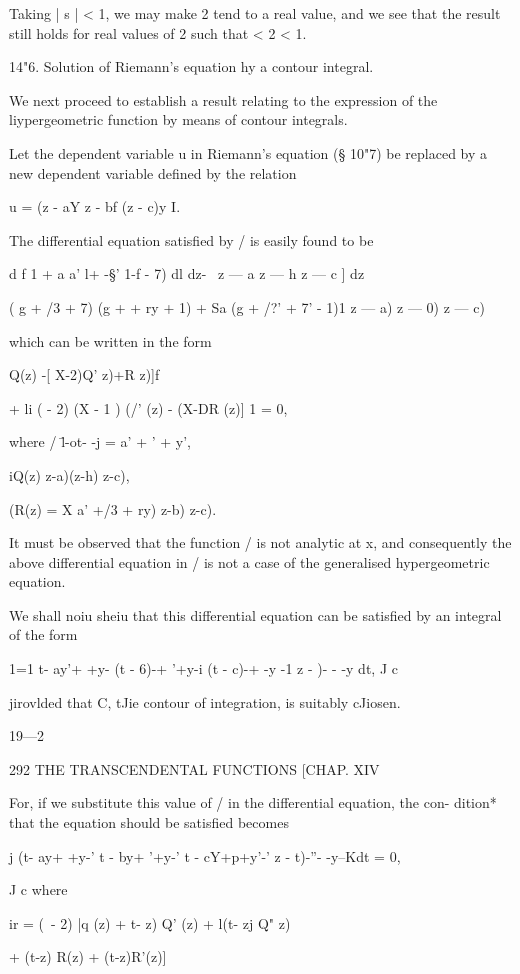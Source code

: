 Taking | s | < 1, we may make 2 tend to a real value, and we see that
the result still holds for real values of 2 such that < 2 < 1.

14"6. Solution of Riemann's equation hy a contour integral.

We next proceed to establish a result relating to the expression of
the liypergeometric function by means of contour integrals.

Let the dependent variable u in Riemann's equation (§ 10"7) be
replaced by a new dependent variable defined by the relation

u = (z - aY z - bf (z - c)y I.

The differential equation satisfied by / is easily found to be

d f 1 + a a' l+ -§' 1-f - 7) dl dz- \ z — a z — h z — c ] dz

( g + /3 + 7) (g + + ry + 1) + Sa (g + /?' + 7' - 1)1 z — a) z — 0) z
— c)

which can be written in the form

Q(z) -[ X-2)Q' z)+R z)]f

+ li ( - 2) (X - 1 ) (/' (z) - (X-DR (z)] 1 = 0,

where / \=l-ot- -j = a' + ' + y',

iQ(z) z-a)(z-h) z-c),

(R(z) = X a' +/3 + ry) z-b) z-c).

It must be observed that the function / is not analytic at x, and
consequently the above differential equation in / is not a case of the
generalised hypergeometric equation.

We shall noiu sheiu that this differential equation can be satisfied
by an integral of the form

1=1 t- ay'+ +y- (t - 6)-+ '+y-i (t - c)-+ -y -1 z - )- - -y dt, J c

jirovlded that C, tJie contour of integration, is suitably cJiosen.

19—2

292 THE TRANSCENDENTAL FUNCTIONS [CHAP. XIV

For, if we substitute this value of / in the differential equation,
the con- dition* that the equation should be satisfied becomes

j (t- ay+ +y-' t - by+ '+y-' t - cY+p+y'-' z - t)-''- -y--Kdt = 0,

J c where

ir = (\ - 2) |q (z) + t- z) Q' (z) + l(t- zj Q" z)

+ (t-z) R(z) + (t-z)R'(z)]

